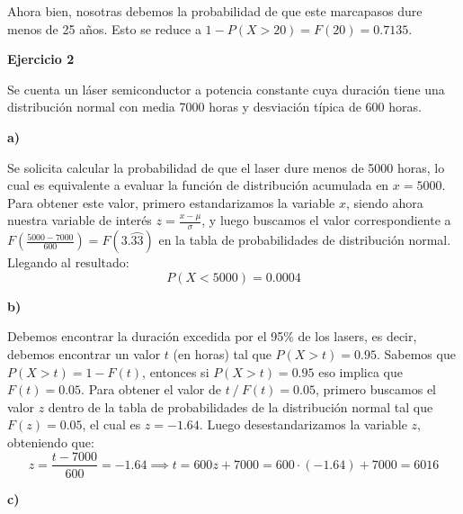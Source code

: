 \documentclass[11pt]{article}
\begin{document}
Ahora bien, nosotras debemos la probabilidad de que este marcapasos dure menos de 25 a\~{n}os. Esto se reduce a $1 - P(X>20) = F(20) = 0.7135.$ 

\textbf{Ejercicio 2}

Se cuenta un láser semiconductor a potencia constante cuya duraci\'on tiene una distribuci\'on normal con media 7000 horas y desviaci\'on t\'ipica de 600 horas.

\textbf{a)}

Se solicita calcular la probabilidad de que el laser dure menos de 5000 horas, lo cual es equivalente a evaluar la funci\'on de distribuci\'on acumulada en $x=5000$. Para obtener este valor, primero estandarizamos la variable $x$, siendo ahora nuestra variable de inter\'es $z = \frac{x - \mu}{\sigma}$, y luego buscamos el valor correspondiente a $F(\frac{5000-7000}{600}) = F(3.\wideparen{33})$ en la tabla de probabilidades de distribuci\'on normal. 
Llegando al resultado: $$P(X<5000) = 0.0004$$

\textbf{b)}

Debemos encontrar la duraci\'on excedida por el 95\% de los lasers, es decir, debemos encontrar un valor $t$ (en horas) tal que $P(X>t) = 0.95$. Sabemos que $P(X>t) = 1 - F(t)$, entonces si $P(X>t) = 0.95$ eso implica que $F(t) = 0.05$. 
Para obtener el valor de $t\ /\ F(t) = 0.05$, primero buscamos el valor $z$ dentro de la tabla de probabilidades de la distribuci\'on normal tal que $F(z) = 0.05$, el cual es $z = -1.64$. Luego desestandarizamos la variable $z$, obteniendo que: 
$$z = \frac{t - 7000}{600} = -1.64 \implies t = 600z + 7000 = 600 \cdot (-1.64) + 7000 = 6016$$

\textbf{c)}
\end{document}
